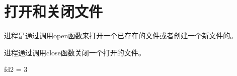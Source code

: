 
\section{打开和关闭文件}
{
    进程是通过调用open函数来打开一个已存在的文件或者创建一个新文件的。

    进程通过调用close函数关闭一个打开的文件。

    \begin{practicec}
        fd2 = 3
    \end{practicec}
}
